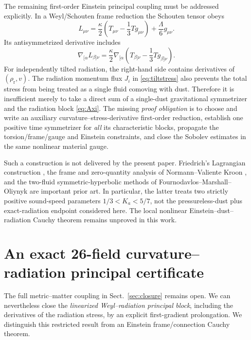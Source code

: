 \documentclass[11pt,a4paper]{article}
\begin{document}
The remaining first-order Einstein
principal coupling must be addressed
explicitly. In a Weyl/Schouten frame
reduction the Schouten tensor obeys
\[
L_{\mu\nu}=
\frac{\kappa}{2}
\left(T_{\mu\nu}
-\frac13Tg_{\mu\nu}\right)
+\frac{\Lambda}{6}g_{\mu\nu}.
\]
Its antisymmetrized derivative includes
\begin{equation}\label{eq:cotton}
\nabla_{[\alpha}L_{\beta]\nu}
=\frac{\kappa}{2}\nabla_{[\alpha}
\left(T_{\beta]\nu}
-\frac13Tg_{\beta]\nu}\right).
\end{equation}
For independently tilted radiation,
the right-hand side contains
derivatives of $(\rho_{\mathrm r},v)$.
The radiation momentum flux $J_i$
in \eqref{eq:tiltstress} also prevents
the total stress from being treated
as a single fluid comoving with dust.
Therefore it is insufficient merely
to take a direct sum of a
single-dust gravitational symmetrizer
and the radiation block
\eqref{eq:Axi}. The missing
\emph{proof obligation} is to choose
and write an auxiliary
curvature--stress-derivative
first-order reduction, establish
one positive time symmetrizer for
\emph{all} its characteristic blocks,
propagate the torsion/frame/gauge
and Einstein constraints, and close
the Sobolev estimates in the same
nonlinear material gauge.

Such a construction is not delivered
by the present paper.
Friedrich's Lagrangian construction
\cite{friedrich}, the frame and
zero-quantity analysis of
Normann--Valiente Kroon
\cite{normann}, and the
two-fluid symmetric-hyperbolic
methods of Fournodavlos--Marshall--Oliynyk
\cite{fournodavlos} are important
prior art. In particular, the latter
treats two strictly positive
sound-speed parameters
$1/3<K_a<5/7$, not the
pressureless-dust plus
exact-radiation endpoint considered
here. The local nonlinear
Einstein--dust--radiation Cauchy
theorem remains unproved in
this work.


\section{An exact 26-field curvature--radiation principal certificate}
\label{sec:curvature-radiation}
The full metric--matter coupling in
Sect.~\ref{sec:closure} remains open.
We can nevertheless close the
\emph{linearized Weyl--radiation
principal block}, including the
derivatives of the radiation stress,
by an explicit first-gradient
prolongation. We distinguish this
restricted result from an Einstein
frame/connection Cauchy theorem.
\end{document}
